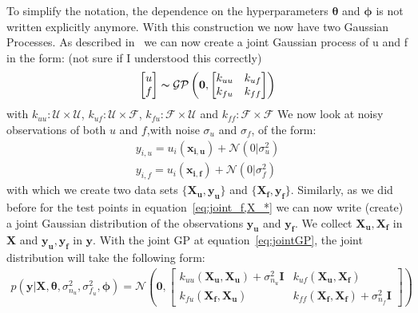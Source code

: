 \documentclass{article}
\begin{document}
To simplify the notation, the dependence on the hyperparameters $\bm{\theta}$ and $\bm{\phi}$ is not written explicitly anymore.
With this construction we now have two Gaussian Processes. As described in~\cite{garnett_2023_full} we can now create a joint Gaussian process of u and f in the form: (not sure if I understood this correctly)
\begin{equation}
    \label{eq:jointGP}
    \begin{aligned}
        \begin{bmatrix}
            u \\
            f
        \end{bmatrix}
    \end{aligned}
    \thicksim \mathcal{GP}\left(\bm{0},
    \begin{bmatrix}
        k_{uu} & k_{uf} \\
        k_{fu} & k_{ff}
    \end{bmatrix}\right)
\end{equation}
with $k_{uu}: \mathcal{U} \times  \mathcal{U}$, $k_{uf}: \mathcal{U} \times  \mathcal{F}$, $k_{fu}: \mathcal{F} \times  \mathcal{U}$ and $k_{ff}: \mathcal{F} \times  \mathcal{F}$
We now look at noisy observations of both $u$ and $f$,with noise $\sigma_u$ and $\sigma_f$, of the form:
\begin{equation}
    \begin{aligned}
        y_{i,u} = u_i(\bm{x_{i,u}}) + \mathcal{N}(0|\sigma_u^2)\\
        y_{i,f} = u_i(\bm{x_{i,f}}) + \mathcal{N}(0|\sigma_f^2)
    \end{aligned}
\end{equation}
with which we create two data sets $\{\bm{X_u,y_u}\}$ and $\{\bm{X_f,y_f}\}$. Similarly, as we did before for the test points in equation~\ref{eq:joint_f,X_*} we can now write (create) a joint Gaussian distribution of the observations $\bm{y_u}$ and $\bm{y_f}$. We collect $\bm{X_u,X_f}$ in $\bm{X}$ and $\bm{y_u,y_f}$ in $\bm{y}$. With the joint GP at equation~\ref{eq:jointGP}, the joint distribution will take the following form:
\begin{equation}
    \begin{aligned}
    p(\bm{y}|\bm{X},\bm{\theta},\sigma_{n_u}^2,\sigma_{f_u}^2,\bm{\phi}) = 
     \mathcal{N}\left(\bm{0},
    \begin{bmatrix}
        k_{uu}(\bm{X_u,X_u}) + \sigma_{n_u}^2 \bm{I} & k_{uf}(\bm{X_u,X_f}) \\
        k_{fu}(\bm{X_f,X_u}) & k_{ff}(\bm{X_f,X_f}) + \sigma_{n_f}^2 \bm{I}
    \end{bmatrix}\right)
    \end{aligned}
\end{equation}
\end{document}
